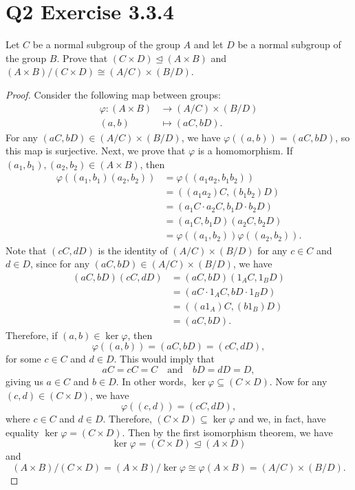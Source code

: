 \documentclass[12pt]{article}
\newenvironment{problem}
    {\begin{lrbox}{\mybox}\begin{minipage}{0.98\textwidth}}
    {\end{minipage}\end{lrbox}\framebox[\textwidth]{\usebox{\mybox}}}
\newcommand{\isp}[1]{\quad\text{#1}\quad}
\let\phi\varphi %
\newcommand{\<}{\left\langle} %
\renewcommand{\>}{\right\rangle} %
\let\teq\trianglelefteq %
\let\iso\cong %
\begin{document}
\section*{Q2 Exercise 3.3.4}
\begin{problem}
    Let $C$ be a normal subgroup of the group $A$ and let $D$ be a normal subgroup of the group $B$. Prove that $(C\times D)\teq(A\times B)$ and $(A\times B)/(C\times D) \iso (A/C)\times(B/D)$.
\end{problem}

\begin{proof}
    Consider the following map between groups:
    \begin{align*}
        \phi : (A\times B) &\to (A/C)\times(B/D) \\
        (a,b) &\mapsto (aC,bD).
    \end{align*}
    For any $(aC,bD) \in (A/C)\times(B/D)$, we have $\phi((a,b)) = (aC,bD)$, so this map is surjective. Next, we prove that $\phi$ is a homomorphism. If $(a_1,b_1),(a_2,b_2)\in(A\times B)$, then
    \begin{align*}
        \phi((a_1,b_1)(a_2, b_2)) 
            &= \phi((a_1a_2, b_1b_2)) \\
            &= ((a_1a_2)C, (b_1b_2)D) \\
            &= (a_1C \cdot a_2C, b_1D \cdot b_2D) \\
            &= (a_1C,b_1D)(a_2C,b_2D) \\
            &= \phi((a_1,b_2))\phi((a_2,b_2)).
    \end{align*}
    Note that $(cC,dD)$ is the identity of $(A/C)\times(B/D)$ for any $c\in C$ and $d\in D$, since for any $(aC,bD)\in(A/C)\times(B/D)$, we have
    \begin{align*}
        (aC,bD)(cC,dD)
            &= (aC,bD)(1_AC,1_BD) \\
            &= (aC \cdot 1_AC, bD \cdot 1_BD) \\
            &= ((a1_A)C, (b1_B)D) \\
            &= (aC, bD).
    \end{align*}
    Therefore, if $(a,b)\in\ker\phi$, then
    \[\phi((a,b)) = (aC,bD) = (cC, dD),\]
    for some $c\in C$ and $d\in D$. This would imply that
    \[aC = cC = C \isp{and} bD = dD = D,\]
    giving us $a\in C$ and $b\in D$. In other words, $\ker\phi \subseteq (C\times D)$. Now for any $(c,d)\in (C\times D)$, we have
    \[\phi((c,d)) = (cC,dD),\]
    where $c\in C$ and $d\in D$. Therefore, $(C\times D)\subseteq\ker\phi$ and we, in fact, have equality $\ker\phi = (C\times D)$. Then by the first isomorphism theorem, we have
    \[\ker\phi = (C\times D) \teq (A\times D)\]
    and
    \[(A\times B)/(C\times D) = (A\times B)/\ker\phi \iso \phi(A\times B) = (A/C)\times(B/D).\]
    
    
    
\end{proof}
\end{document}
